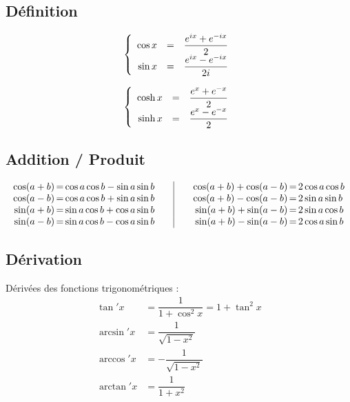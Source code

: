 \documentclass[11pt,a4paper,fleqn,pdftex]{report}
\begin{document}
\subsection{Définition}
\begin{minipage}{0.45\textwidth}
\begin{equation}\label{def:cos}
\left\lbrace
\begin{array}{r c l}
\cos{x}&=&\dfrac{e^{ix}+e^{-ix}}{2}\\
\sin{x}&=&\dfrac{e^{ix}-e^{-ix}}{2i}\\
\end{array}
\right.
\end{equation}
\end{minipage}\hspace{0.1\textwidth}
\begin{minipage}{0.45\textwidth}
\begin{equation}\label{def:cosh}
\left\lbrace
\begin{array}{r c l}
\cosh{x}&=&\dfrac{e^{x}+e^{-x}}{2}\\
\sinh{x}&=&\dfrac{e^{x}-e^{-x}}{2}\\
\end{array}
\right.
\end{equation}
\end{minipage}
%
\subsection{Addition / Produit}
\begin{equation}\label{trigo}
\begin{array}{r@{\, = \,}l @{\qquad}|@{\qquad} r@{\, = \,}l}
\cos (a+b) & \cos a \cos b - \sin a \sin b 
    & \cos (a+b) + \cos (a-b) & 2 \cos a \cos b \\
\cos (a-b) & \cos a \cos b + \sin a \sin b 
    & \cos (a+b) - \cos (a-b) & 2 \sin a \sin b \\
\sin (a+b) & \sin a \cos b + \cos a \sin b 
    & \sin (a+b) + \sin (a-b) & 2 \sin a \cos b \\
\sin (a-b) & \sin a \cos b - \cos a \sin b 
    & \sin (a+b) - \sin (a-b) & 2 \cos a \sin b
\end{array}
\end{equation}
\subsection{Dérivation} %
\label{sub:derivation_trigo}
Dérivées des fonctions trigonométriques : 
\begin{align*}
	 \tan' x 	&= \dfrac{1}{1 + \cos^2 x} = 1 + \tan^2 x \\
	 \arcsin' x &= \dfrac{1}{\sqrt{1 - x^2}} \\
	 \arccos' x &= -\dfrac{1}{\sqrt{1-x^2}} \\
	 \arctan' x &= \dfrac{1}{1+x^2}
\end{align*}
\end{document}
